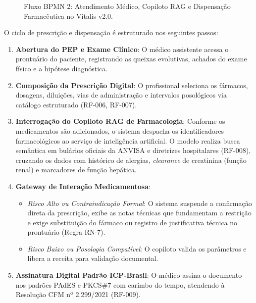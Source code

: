 \begin{figure}[H]
{%
}
\caption{Fluxo BPMN 2: Atendimento Médico, Copiloto RAG e Dispensação Farmacêutica no Vitalis v2.0.}
\label{fig:bpmn_fluxo2}
\end{figure}

O ciclo de prescrição e dispensação é estruturado nos seguintes passos:
\begin{enumerate}[leftmargin=*]
    \item \textbf{Abertura do PEP e Exame Clínico}: O médico assistente acessa o prontuário do paciente, registrando as queixas evolutivas, achados do exame físico e a hipótese diagnóstica.
    \item \textbf{Composição da Prescrição Digital}: O profissional seleciona os fármacos, dosagens, diluições, vias de administração e intervalos posológicos via catálogo estruturado (RF-006, RF-007).
    \item \textbf{Interrogação do Copiloto RAG de Farmacologia}: Conforme os medicamentos são adicionados, o sistema despacha os identificadores farmacológicos ao serviço de inteligência artificial. O modelo realiza busca semântica em bulários oficiais da ANVISA e diretrizes hospitalares \cite{lewis_rag:2020} (RF-008), cruzando os dados com histórico de alergias, \textit{clearance} de creatinina (função renal) e marcadores de função hepática.
    \item \textbf{Gateway de Interação Medicamentosa}:
    \begin{itemize}
        \item \textit{Risco Alto ou Contraindicação Formal}: O sistema suspende a confirmação direta da prescrição, exibe as notas técnicas que fundamentam a restrição e exige substituição do fármaco ou registro de justificativa técnica no prontuário (Regra RN-7).
        \item \textit{Risco Baixo ou Posologia Compatível}: O copiloto valida os parâmetros e libera a receita para validação documental.
    \end{itemize}
    \item \textbf{Assinatura Digital Padrão ICP-Brasil}: O médico assina o documento nos padrões PAdES e PKCS\#7 com carimbo do tempo, atendendo à Resolução CFM nº 2.299/2021 \cite{cfm_digital:2021} (RF-009).

\end{enumerate}
